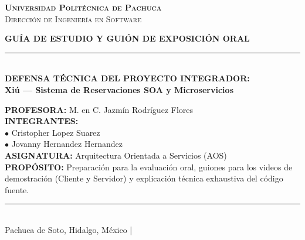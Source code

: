 \documentclass[12pt,a4paper]{article}
\begin{document}

\begin{titlepage}
\vspace*{1.0cm}
\begin{center}
  {\Large\scshape\bfseries Universidad Politécnica de Pachuca}\\[4pt]
  {\small\scshape Dirección de Ingeniería en Software}
\end{center}
\vspace{1.5cm}
\begin{center}
  {\Huge\bfseries GUÍA DE ESTUDIO Y GUIÓN DE EXPOSICIÓN ORAL}\\[12pt]
  \rule{0.7\textwidth}{1.5pt}\\[16pt]
  {\Large\bfseries DEFENSA TÉCNICA DEL PROYECTO INTEGRADOR:}\\[8pt]
  {\LARGE\bfseries\color{vino}Xiú --- Sistema de Reservaciones SOA y Microservicios}
\end{center}
\vspace{1.5cm}
\noindent\textbf{PROFESORA:} M. en C. Jazmín Rodríguez Flores\\[8pt]
\noindent\textbf{INTEGRANTES:}\\[4pt]
\noindent\hspace{1cm}$\bullet$ Cristopher Lopez Suarez\\[4pt]
\noindent\hspace{1cm}$\bullet$ Jovanny Hernandez Hernandez\\[8pt]
\noindent\textbf{ASIGNATURA:} Arquitectura Orientada a Servicios (AOS)\\[8pt]
\noindent\textbf{PROPÓSITO:} Preparación para la evaluación oral, guiones para los videos de demostración (Cliente y Servidor) y explicación técnica exhaustiva del código fuente.
\vfill
\begin{center}
  \rule{0.8\textwidth}{0.5pt}\\[4pt]
  {\small Pachuca de Soto, Hidalgo, México \quad | }
\end{center}
\end{titlepage}
\restoregeometry
\end{document}
